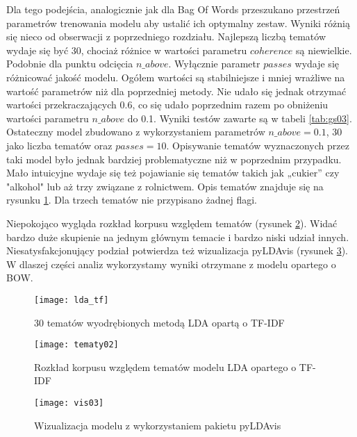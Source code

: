 \documentclass[a4paper,11pt,twoside]{report}
\theoremstyle{definition}
\begin{document}
Dla tego podejścia, analogicznie jak dla Bag Of Words przeszukano przestrzeń parametrów trenowania modelu aby ustalić ich optymalny zestaw. Wyniki różnią się nieco od obserwacji z poprzedniego rozdziału. Najlepszą liczbą tematów wydaje się być 30, chociaż różnice w wartości parametru $coherence$ są niewielkie. Podobnie dla punktu odcięcia $n\_above$. Wyłącznie parametr $passes$ wydaje się różnicować jakość modelu.  Ogółem wartości są stabilniejsze i mniej wrażliwe na wartość parametrów niż dla poprzedniej metody. Nie udało się jednak otrzymać wartości przekraczających 0.6, co się udało poprzednim razem po obniżeniu wartości parametru $n\_above$ do 0.1. Wyniki testów zawarte są w tabeli \ref{tab:gs03}. Ostateczny model zbudowano z wykorzystaniem parametrów $n\_above=0.1$, 30 jako liczba tematów oraz $passes=10$. Opisywanie tematów wyznaczonych przez taki model było jednak bardziej problematyczne niż w poprzednim przypadku. Mało intuicyjne wydaje się też pojawianie się tematów takich jak „cukier” czy "alkohol" lub aż trzy związane z rolnictwem. Opis tematów znajduje się na rysunku \ref{lda_tf}. Dla trzech tematów nie przypisano żadnej flagi.

Niepokojąco wygląda rozkład korpusu względem tematów (rysunek \ref{top_dist02}). Widać bardzo duże skupienie na jednym głównym temacie i bardzo niski udział innych. Niesatysfakcjonujący podział potwierdza też wizualizacja pyLDAvis (rysunek \ref{vis03}).
W dlaszej części analiz wykorzystamy wyniki otrzymane z modelu opartego o BOW.

\begin{figure}
\texttt{[image: lda\_tf]} 
\centering \caption{30 tematów wyodrębionych metodą LDA opartą o TF-IDF}
 \label{lda_tf}
\end{figure}


\begin{figure}
\texttt{[image: tematy02]} 
\centering \caption{Rozkład korpusu względem tematów modelu LDA opartego o TF-IDF}
 \label{top_dist02}
\end{figure}

\begin{figure}
\texttt{[image: vis03]} 
\centering \caption{Wizualizacja modelu z wykorzystaniem pakietu pyLDAvis}
 \label{vis03}
\end{figure}
\end{document}
